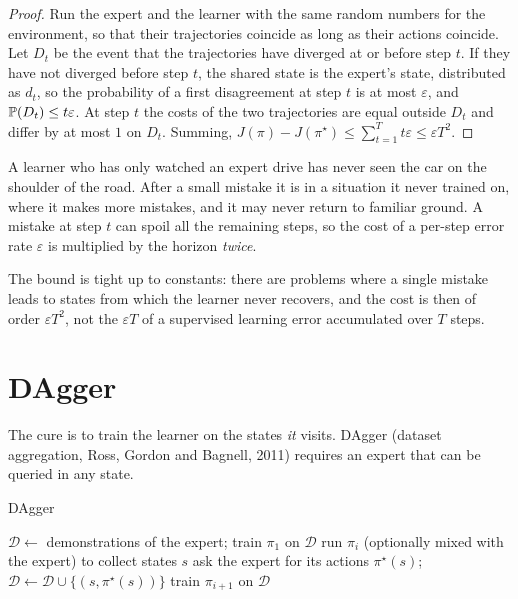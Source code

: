 \begin{proof}
  Run the expert and the learner with the same random numbers for the
  environment, so that their trajectories coincide as long as their actions
  coincide. Let $D_t$ be the event that the trajectories have diverged at
  or before step $t$. If they have not diverged before step $t$, the shared
  state is the expert's state, distributed as $d_t$, so the probability of
  a first disagreement at step $t$ is at most $\varepsilon$, and $\mathbb{P}(D_t)
  \leq t \varepsilon$. At step $t$ the costs of the two trajectories are
  equal outside $D_t$ and differ by at most $1$ on $D_t$. Summing,
  $J(\pi) - J(\pi^\star) \leq \sum_{t=1}^T t\varepsilon \leq \varepsilon
  T^2$.
\end{proof}

\begin{intuition}
  A learner who has only watched an expert drive has never seen the car
  on the shoulder of the road. After a small mistake it is in a situation
  it never trained on, where it makes more mistakes, and it may never
  return to familiar ground. A mistake at step $t$ can spoil all the
  remaining steps, so the cost of a per-step error rate $\varepsilon$ is
  multiplied by the horizon \emph{twice}.
\end{intuition}

The bound is tight up to constants: there are problems where a single
mistake leads to states from which the learner never recovers, and the
cost is then of order $\varepsilon T^2$, not the $\varepsilon T$ of a
supervised learning error accumulated over $T$ steps.

\section{DAgger}

The cure is to train the learner on the states \emph{it} visits. DAgger
(dataset aggregation, Ross, Gordon and Bagnell, 2011) requires an expert
that can be queried in any state.

\begin{algobox}{DAgger}
  \begin{algorithmic}[1]
    \State $\mathcal{D} \gets$ demonstrations of the expert; train
      $\pi_1$ on $\mathcal{D}$
      \State run $\pi_i$ (optionally mixed with the expert) to collect states
        $s$
      \State ask the expert for its actions $\pi^\star(s)$; $\mathcal{D}
        \gets \mathcal{D} \cup \{(s, \pi^\star(s))\}$
      \State train $\pi_{i+1}$ on $\mathcal{D}$
    \EndFor
  \end{algorithmic}
\end{algobox}

